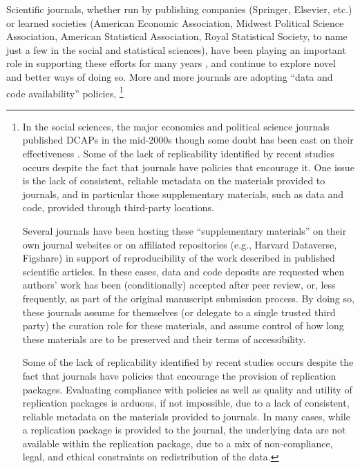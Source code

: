Scientific journals, whether run by publishing companies (Springer, Elsevier, etc.) or learned societies (American Economic Association, Midwest Political Science Association, American Statistical Association, Royal Statistical Society, to name just a few in the social and statistical sciences), have been playing an important role in supporting these efforts for many years \parencite{stodden_enhancing_2016}, and continue to explore novel and better ways of doing so. More and more journals are adopting ``data and code availability'' policies,%
\footnote{In the social sciences, the major economics and political science journals published \acp{DCAP} in the mid-2000s \parencite{American_Economic_Association2008-wayback,nicholaseubankThePoliticalMethodologist2014}
though some doubt has been cast on their effectiveness \parencite{stodden_toward_2013,Stoddenempiricalanalysisjournal2018,Hoeffler2017,ChangAm.Econ.Rev.2017}. Some of the lack of replicability identified by recent studies \parencite{Hoeffler2017a,Chang2017,ChangLi2015,CamererEvaluatingreplicabilitylaboratory2016,Stoddenempiricalanalysisjournal2018}  occurs despite the fact that journals have  policies that encourage it. One issue is the lack of consistent, reliable metadata on the materials provided to journals, and in particular those supplementary materials, such as data and code, provided through third-party locations.

Several journals have been hosting these ``supplementary materials'' on their own journal websites or on affiliated repositories (e.g., Harvard Dataverse, Figshare) in support of reproducibility of the work described in published scientific articles. In these cases, data and code deposits are requested when authors' work has been (conditionally) accepted after peer review, or, less frequently, as part of the original manuscript submission process. By doing so, these journals assume for themselves (or delegate to a single trusted third party) the curation role for these materials, and assume control of how long these materials are to be preserved and their terms of accessibility.

Some of the lack of replicability identified by recent studies \parencite{Hoeffler2017a,Chang2017,ChangLi2015,CamererScience2016,StoddenPNAS2018}  occurs despite the fact that journals have  policies that encourage the provision of replication packages. Evaluating compliance with policies as well as quality and utility of replication packages is arduous, if not impossible, due to a lack of consistent, reliable metadata on the materials provided to journals. In many cases, while a replication package is provided to the journal, the underlying data are not available within the replication package, due to a mix of non-compliance, legal, and ethical constraints on redistribution of the data. 

}
